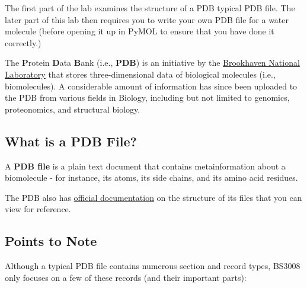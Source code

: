 \documentclass[
  letterpaper,
  DIV=11,
  numbers=noendperiod]{scrreprt}
\begin{document}
The first part of the lab examines the structure of a PDB typical PDB
file. The later part of this lab then requires you to write your own PDB
file for a water molecule (before opening it up in PyMOL to ensure that
you have done it correctly.)

The \textbf{P}rotein \textbf{D}ata \textbf{B}ank (i.e., \textbf{PDB}) is
an initiative by the \href{https://www.bnl.gov/world/}{Brookhaven
National Laboratory} that stores three-dimensional data of biological
molecules (i.e., biomolecules). A considerable amount of information has
since been uploaded to the PDB from various fields in Biology, including
but not limited to genomics, proteonomics, and structural biology.

\hypertarget{what-is-a-pdb-file}{%
\subsection{What is a PDB File?}\label{what-is-a-pdb-file}}

A \textbf{PDB file} is a plain text document that contains
metainformation about a biomolecule - for instance, its atoms, its side
chains, and its amino acid residues.

The PDB also has
\href{https://files.wwpdb.org/pub/pdb/doc/format_descriptions/Format_v33_Letter.pdf}{official
documentation} on the structure of its files that you can view for
reference.

\hypertarget{points-to-note}{%
\subsection{Points to Note}\label{points-to-note}}

Although a typical PDB file contains numerous section and record types,
BS3008 only focuses on a few of these records (and their important
parts):
\end{document}
